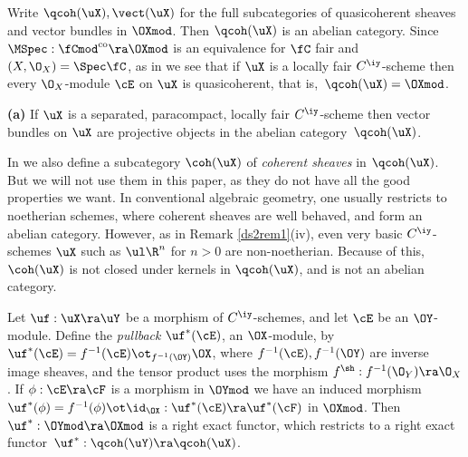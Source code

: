 \documentclass{article}
\begin{document}
\begin{dfn}
Write $\qcoh(\uX),\vect(\uX)$ for the full subcategories of
quasicoherent sheaves and vector bundles in $\OXmod$. Then
$\qcoh(\uX)$ is an abelian category. Since
$\MSpec:\fCmod^{\rm co}\ra\OXmod$ is an equivalence for $\fC$ fair
and $(X,\O_X)=\Spec\fC$, as in \cite[Cor.~6.11]{Joyc4} we see that
if $\uX$ is a locally fair $C^\iy$-scheme then every $\O_X$-module
$\cE$ on $\uX$ is quasicoherent, that is,~$\qcoh(\uX)=\OXmod$.
\label{ds2def7}
\end{dfn}

\begin{rem}{\bf(a)} If $\uX$ is a separated, paracompact, locally
fair $C^\iy$-scheme then vector bundles on $\uX$ are projective
objects in the abelian category~$\qcoh(\uX)$.

\smallskip

 In \cite[\S 6.3]{Joyc4} we also define a
subcategory $\coh(\uX)$ of {\it coherent
sheaves\/} in
$\qcoh(\uX)$. But we will not use them in this paper, as they do not
have all the good properties we want. In conventional algebraic
geometry, one usually restricts to noetherian schemes, where
coherent sheaves are well behaved, and form an abelian category.
However, as in Remark \ref{ds2rem1}(iv), even very basic
$C^\iy$-schemes $\uX$ such as $\ul\R^n$ for $n>0$ are
non-noetherian. Because of this, $\coh(\uX)$ is not closed under
kernels in $\qcoh(\uX)$, and is not an abelian category.
\label{ds2rem2}
\end{rem}

\begin{dfn} Let $\uf:\uX\ra\uY$ be a morphism of $C^\iy$-schemes,
and let $\cE$ be an $\OY$-module. Define the {\it pullback\/}
$\uf^*(\cE)$, an $\OX$-module, by $\uf^*(\cE)=f^{-1}(\cE)
\ot_{f^{-1}(\OY)}\OX$, where $f^{-1}(\cE),f^{-1}(\OY)$ are inverse
image sheaves, and the tensor product uses the morphism
$f^\sh:f^{-1}(\O_Y)\ra\O_X$. If $\phi:\cE\ra\cF$ is a morphism in
$\OYmod$ we have an induced morphism $\uf^*(\phi)=f^{-1}(\phi)
\ot\id_{\OX}:\uf^*(\cE)\ra\uf^*(\cF)$ in $\OXmod$. Then
$\uf^*:\OYmod\ra\OXmod$ is a right exact functor, which restricts to
a right exact functor~$\uf^*:\qcoh(\uY)\ra\qcoh(\uX)$.
\label{ds2def8}
\end{dfn}
\end{document}
